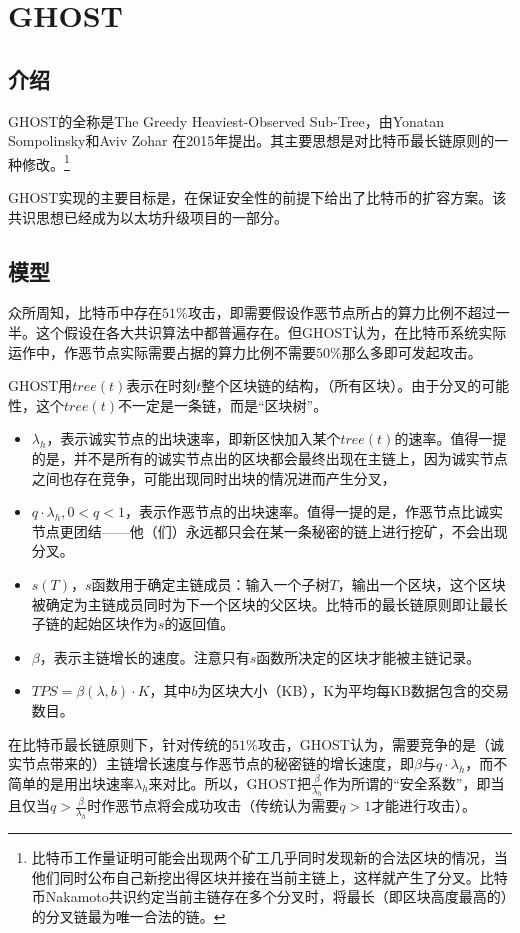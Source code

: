 \section{GHOST}
\subsection{介绍}
GHOST的全称是The Greedy Heaviest-Observed Sub-Tree，由Yonatan Sompolinsky和Aviv Zohar 在2015年提出。其主要思想是对比特币最长链原则的一种修改。\footnote{比特币工作量证明可能会出现两个矿工几乎同时发现新的合法区块的情况，当他们同时公布自己新挖出得区块并接在当前主链上，这样就产生了分叉。比特币Nakamoto共识约定当前主链存在多个分叉时，将最长（即区块高度最高的）的分叉链最为唯一合法的链。}	

GHOST实现的主要目标是，在保证安全性的前提下给出了比特币的扩容方案。该共识思想已经成为以太坊升级项目的一部分。

\subsection{模型}
众所周知，比特币中存在$51\%$攻击，即需要假设作恶节点所占的算力比例不超过一半。这个假设在各大共识算法中都普遍存在。但GHOST认为，在比特币系统实际运作中，作恶节点实际需要占据的算力比例不需要$50\%$那么多即可发起攻击。


GHOST用$tree(t)$表示在时刻$t$整个区块链的结构，（所有区块）。由于分叉的可能性，这个$tree(t)$不一定是一条链，而是“区块树”。
\begin{itemize}
	\item $\lambda_h$，表示诚实节点的出块速率，即新区快加入某个$tree(t)$的速率。值得一提的是，并不是所有的诚实节点出的区块都会最终出现在主链上，因为诚实节点之间也存在竞争，可能出现同时出块的情况进而产生分叉，
	\item $q\cdot\lambda_h,0<q<1$，表示作恶节点的出块速率。值得一提的是，作恶节点比诚实节点更团结——他（们）永远都只会在某一条秘密的链上进行挖矿，不会出现分叉。
	\item $s(T)$，$s$函数用于确定主链成员：输入一个子树$T$，输出一个区块，这个区块被确定为主链成员同时为下一个区块的父区块。比特币的最长链原则即让最长子链的起始区块作为$s$的返回值。
	\item $\beta$，表示主链增长的速度。注意只有$s$函数所决定的区块才能被主链记录。
	\item $TPS=\beta(\lambda,b)\cdot K$，其中$b$为区块大小（KB），K为平均每KB数据包含的交易数目。
\end{itemize}
在比特币最长链原则下，针对传统的$51\%$攻击，GHOST认为，{\color{red}需要竞争的是（诚实节点带来的）主链增长速度与作恶节点的秘密链的增长速度，即$\beta$与$q\cdot\lambda_h$，而不简单的是用出块速率$\lambda_h$来对比。}所以，GHOST把$\frac{\beta}{\lambda_h}$作为所谓的“安全系数”，即当且仅当$q>\frac{\beta}{\lambda_h}$时作恶节点将会成功攻击（传统认为需要$q>1$才能进行攻击）。
	
